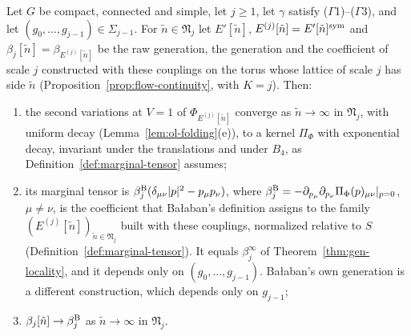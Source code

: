 \begin{proposition}\label{prop:beta-identification}
Let $G$ be compact, connected and simple, let $j\ge1$, let $\gamma$ satisfy ($\Gamma$1)--($\Gamma$3), and let $(g_0,\dots,g_{j-1})\in\Sigma_{j-1}$. For $\tilde n\in\mathfrak N_j$ let $E'[\tilde n]$, $E^{(j)}[\tilde n]=E'[\tilde n]^{\rm sym}$ and $\beta_j[\tilde n]=\beta_{E^{(j)}[\tilde n]}$ be the raw generation, the generation and the coefficient of scale $j$ constructed with these couplings on the torus whose lattice of scale $j$ has side $\tilde n$ (Proposition~\ref{prop:flow-continuity}, with $K=j$). Then:
\begin{enumerate}[label=(\alph*)]
\item the second variations at $V=1$ of $\Phi_{E^{(j)}[\tilde n]}$ converge as $\tilde n\to\infty$ in $\mathfrak N_j$, with uniform decay (Lemma~\ref{lem:ol-folding}(e)), to a kernel $\Pi_\Phi$ with exponential decay, invariant under the translations and under $B_4$, as Definition~\ref{def:marginal-tensor} assumes;
\item its marginal tensor is $\beta^{\rm B}_j(\delta_{\mu\nu}|p|^2-p_\mu p_\nu)$, where $\beta^{\rm B}_j=-\partial_{p_\mu}\partial_{p_\nu}\Pi_\Phi(p)_{\mu\nu}|_{p=0}$, $\mu\ne\nu$, is the coefficient that Ba\l aban's definition \cite[(1.20)--(1.22)]{BalYM4I} assigns to the family $(E^{(j)}[\tilde n])_{\tilde n\in\mathfrak N_j}$ built with these couplings, normalized relative to $S$ (Definition~\ref{def:marginal-tensor}). It equals $\beta^\infty_j$ of Theorem~\ref{thm:gen-locality}, and it depends only on $(g_0,\dots,g_{j-1})$. Ba\l aban's own generation is a different construction, which depends only on $g_{j-1}$;
\item $\beta_j[\tilde n]\to\beta^{\rm B}_j$ as $\tilde n\to\infty$ in $\mathfrak N_j$.
\end{enumerate}
\end{proposition}

